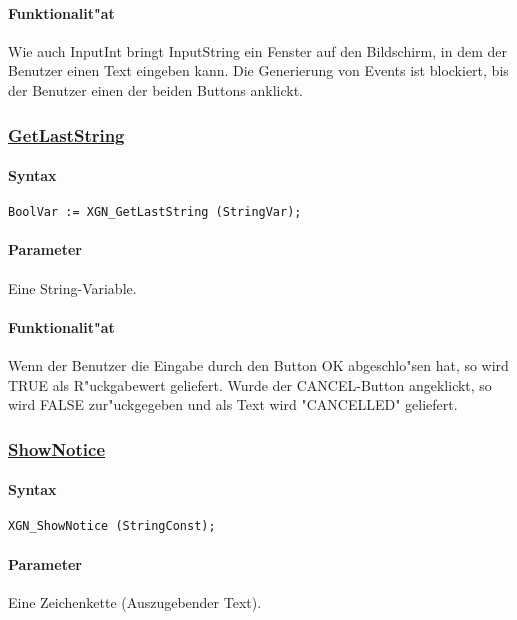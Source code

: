\paragraph{Funktionalit"at}
Wie auch InputInt bringt InputString ein Fenster auf den Bildschirm, in
dem der Benutzer einen Text eingeben kann. Die Generierung von Events
ist blockiert, bis der Benutzer einen der beiden Buttons anklickt.


\subsubsection{\underline{GetLastString}}

\paragraph{Syntax}
\begin{verbatim}
BoolVar := XGN_GetLastString (StringVar);
\end{verbatim}

\paragraph{Parameter}
Eine String-Variable.


\paragraph{Funktionalit"at}
Wenn der Benutzer die Eingabe durch den Button OK abgeschlo"sen hat, so
wird TRUE als R"uckgabewert geliefert. Wurde der CANCEL-Button
angeklickt, so wird FALSE zur"uckgegeben und als Text wird "CANCELLED"
geliefert.


\subsubsection{\underline{ShowNotice}}

\paragraph{Syntax}
\begin{verbatim}
XGN_ShowNotice (StringConst);
\end{verbatim}

\paragraph{Parameter}
Eine Zeichenkette (Auszugebender Text).


